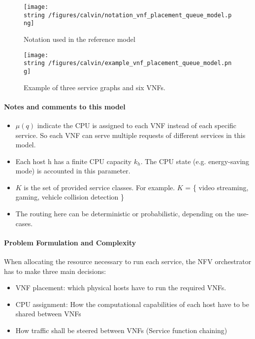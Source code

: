 \documentclass[12pt]{article}
\begin{document}
\begin{figure}[h]
    \centering
    \texttt{[image: \\string~/figures/calvin/notation\_vnf\_placement\_queue\_model.png]}
    \caption{Notation used in the reference model}
    \label{fig:notation}
\end{figure}

\begin{figure}[h]
    \centering
    \texttt{[image: \\string~/figures/calvin/example\_vnf\_placement\_queue\_model.png]}
    \caption{Example of three service graphs and six VNFs.}
    \label{fig:example_3_6}
\end{figure}

\paragraph{Notes and comments to this model}%
\label{par:notes_and_comments_to_this_model}

\begin{itemize}
    \item $\mu(q)$ indicate the CPU is assigned to each VNF instead of each specific service. So each VNF can serve
        multiple requests of different services in this model.
    \item Each host h has a finite CPU capacity $k_{h}$. The CPU state (e.g. energy-saving mode) is accounted in this
        parameter.
    \item $K$ is the set of provided service classes. For example. $K$ = \{ video streaming, gaming, vehicle collision
        detection \}
    \item The routing here can be deterministic or probabilistic, depending on the use-cases.
\end{itemize}

\paragraph{Problem Formulation and Complexity}%
\label{par:problem_formulation_and_complexity}

When allocating the resource necessary to run each service, the NFV orchestrator has to make three main decisions:

\begin{itemize}
    \item VNF placement: which physical hosts have to run the required VNFs.
    \item CPU assignment: How the computational capabilities of each host have to be shared between VNFs
    \item How traffic shall be steered between VNFs (Service function chaining)
\end{itemize}
\end{document}
